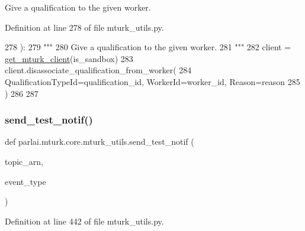 \begin{DoxyVerb}Give a qualification to the given worker.
\end{DoxyVerb}
 

Definition at line 278 of file mturk\+\_\+utils.\+py.


\begin{DoxyCode}
278 ):
279     \textcolor{stringliteral}{"""}
280 \textcolor{stringliteral}{    Give a qualification to the given worker.}
281 \textcolor{stringliteral}{    """}
282     client = \hyperlink{namespaceparlai_1_1mturk_1_1core_1_1mturk__utils_a577e2527c04682284394b0951a090695}{get\_mturk\_client}(is\_sandbox)
283     client.disassociate\_qualification\_from\_worker(
284         QualificationTypeId=qualification\_id, WorkerId=worker\_id, Reason=reason
285     )
286 
287 
\end{DoxyCode}
\mbox{\label{namespaceparlai_1_1mturk_1_1core_1_1mturk__utils_a03b8f25675cb76e8b27205ca5d26e623}} 
\subsubsection{\texorpdfstring{send\+\_\+test\+\_\+notif()}{send\_test\_notif()}}
{\footnotesize\ttfamily def parlai.\+mturk.\+core.\+mturk\+\_\+utils.\+send\+\_\+test\+\_\+notif (\begin{DoxyParamCaption}\item[{}]{topic\+\_\+arn,  }\item[{}]{event\+\_\+type }\end{DoxyParamCaption})}



Definition at line 442 of file mturk\+\_\+utils.\+py.



